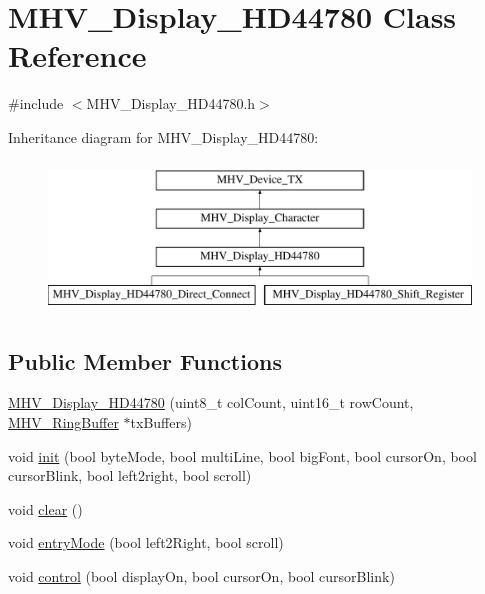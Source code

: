 \hypertarget{class_m_h_v___display___h_d44780}{
\section{\-M\-H\-V\-\_\-\-Display\-\_\-\-H\-D44780 \-Class \-Reference}
\label{class_m_h_v___display___h_d44780}
}


{\ttfamily \#include $<$\-M\-H\-V\-\_\-\-Display\-\_\-\-H\-D44780.\-h$>$}

\-Inheritance diagram for \-M\-H\-V\-\_\-\-Display\-\_\-\-H\-D44780\-:\begin{figure}[H]
\begin{center}
\leavevmode
\includegraphics[height=4.000000cm]{class_m_h_v___display___h_d44780}
\end{center}
\end{figure}
\subsection*{\-Public \-Member \-Functions}
\begin{DoxyCompactItemize}
\item 
\hyperlink{class_m_h_v___display___h_d44780_a11a3f21e245e2cb1edfbb8b9ba6d56d4}{\-M\-H\-V\-\_\-\-Display\-\_\-\-H\-D44780} (uint8\-\_\-t col\-Count, uint16\-\_\-t row\-Count, \hyperlink{class_m_h_v___ring_buffer}{\-M\-H\-V\-\_\-\-Ring\-Buffer} $\ast$tx\-Buffers)
\item 
void \hyperlink{class_m_h_v___display___h_d44780_a4e0ed118d834b0c0ac68ac03d28f4246}{init} (bool byte\-Mode, bool multi\-Line, bool big\-Font, bool cursor\-On, bool cursor\-Blink, bool left2right, bool scroll)
\item 
void \hyperlink{class_m_h_v___display___h_d44780_a1dd0adb212ad9485352ee3a59e7e4e7b}{clear} ()
\item 
void \hyperlink{class_m_h_v___display___h_d44780_a428016d2114187bbe3030e8c08861897}{entry\-Mode} (bool left2\-Right, bool scroll)
\item 
void \hyperlink{class_m_h_v___display___h_d44780_ada0c9ee4be9958c59e02bc55e4033511}{control} (bool display\-On, bool cursor\-On, bool cursor\-Blink)
\end{DoxyCompactItemize}
